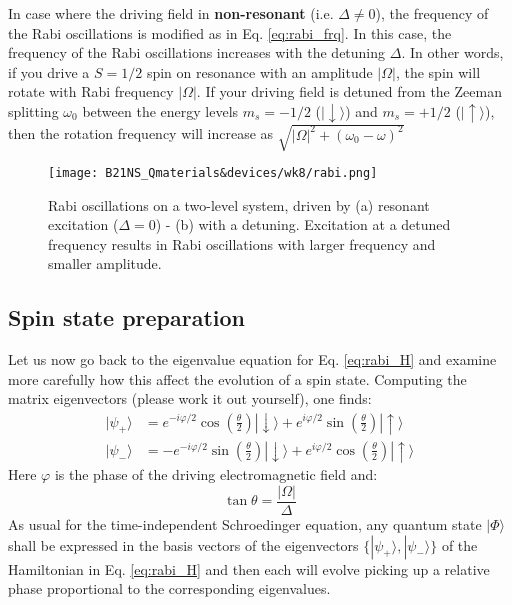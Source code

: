 \documentclass[a4paper,11pt]{article}
\newcommand{\ket}[1]{| #1 \rangle}
\begin{document}
In case where the driving field in {\bf non-resonant} (i.e. $\Delta \neq 0$), the frequency of the Rabi oscillations is modified as in Eq. \ref{eq:rabi_frq}. In this case, the frequency of the Rabi oscillations increases with the detuning $\Delta$. In other words, if you drive a $S=1/2$ spin on resonance with an amplitude $|\Omega|$, the spin will rotate with Rabi frequency $|\Omega|$.
If your driving field is detuned from the Zeeman splitting $\omega_0$ between the energy levels $m_s = -1/2$  ($\ket{\downarrow}$) and $m_s = +1/2$ ($\ket{\uparrow}$), then the rotation frequency will increase as $\sqrt{|\Omega|^2+(\omega_0 - \omega)^2}$ 

\begin{figure}[h]
    \centering
    \texttt{[image: B21NS\_Qmaterials\&devices/wk8/rabi.png]}
    \caption{Rabi oscillations on a two-level system, driven by (a) resonant excitation ($\Delta = 0$) - (b) with a detuning. Excitation at a detuned frequency results in Rabi oscillations with larger frequency and smaller amplitude.}
    \label{fig:rabi}
\end{figure}


\subsection{Spin state preparation}
Let us now go back to the eigenvalue equation for Eq. \ref{eq:rabi_H} and examine more carefully how this affect the evolution of a spin state. Computing the matrix eigenvectors (please work it out yourself), one finds:
\begin{subequations}
\begin{align}
\ket{\psi_+}&=e^{-i\varphi/2} \cos{\left( \frac{\theta}{2}\right)} \ket{\downarrow} + e^{i\varphi/2} \sin{\left(\frac{\theta}{2}\right)} \ket{\uparrow}\\
\ket{\psi_-}&=-e^{-i\varphi/2} \sin{\left( \frac{\theta}{2}\right)} \ket{\downarrow} + e^{i\varphi/2} \cos{\left(\frac{\theta}{2}\right)} \ket{\uparrow}
\end{align}
\end{subequations}
Here $\varphi$ is the phase of the driving electromagnetic field and:
\begin{equation}
    \tan{\theta} = \frac{|\Omega|}{\Delta}
\end{equation}
As usual for the time-independent Schroedinger equation, any quantum state $\ket{\Phi}$ shall be expressed in the basis vectors of the eigenvectors $\lbrace \ket{\psi_+}, \ket{\psi_-} \rbrace$ of the Hamiltonian in Eq. \ref{eq:rabi_H} and then each will evolve picking up a relative phase proportional to the corresponding eigenvalues.
\end{document}
